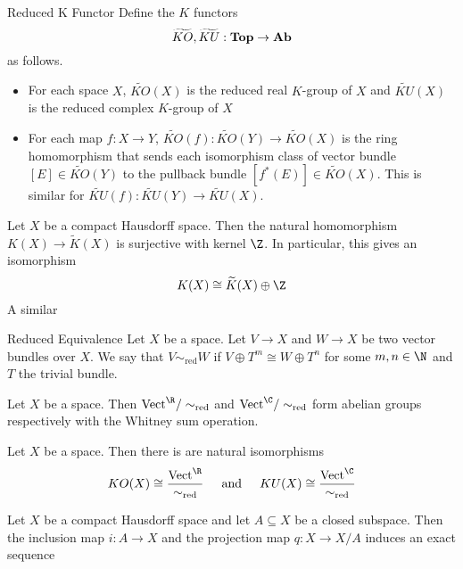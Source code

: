 \documentclass[a4paper]{article}
\begin{document}
\begin{defn}{Reduced K Functor}{} Define the $K$ functors $$\widetilde{KO},\widetilde{KU}:\bold{Top}\to\bold{Ab}$$ as follows. 
\begin{itemize}
\item For each space $X$, $\widetilde{KO}(X)$ is the reduced real $K$-group of $X$ and $\widetilde{KU}(X)$ is the reduced complex $K$-group of $X$
\item For each map $f:X\to Y$, $\widetilde{KO}(f):\widetilde{KO}(Y)\to\widetilde{KO}(X)$ is the ring homomorphism that sends each isomorphism class of vector bundle $[E]\in \widetilde{KO}(Y)$ to the pullback bundle $[f^\ast(E)]\in\widetilde{KO}(X)$. This is similar for $\widetilde{KU}(f):\widetilde{KU}(Y)\to\widetilde{KU}(X)$. 
\end{itemize}
\end{defn}

\begin{thm}{}{} Let $X$ be a compact Hausdorff space. Then the natural homomorphism $K(X)\to\widetilde{K}(X)$ is surjective with kernel $\Z$. In particular, this gives an isomorphism $$K(X)\cong\widetilde{K}(X)\oplus\Z$$ A similar 
\end{thm}

\begin{defn}{Reduced Equivalence}{} Let $X$ be a space. Let $V\to X$ and $W\to X$ be two vector bundles over $X$. We say that $V\sim_\text{red}W$ if $V\oplus T^m\cong W\oplus T^n$ for some $m,n\in\N$ and $T$ the trivial bundle. 
\end{defn}

\begin{prp}{}{} Let $X$ be a space. Then $\text{Vect}^\R/\sim_\text{red}$ and $\text{Vect}^\C/\sim_\text{red}$ form abelian groups respectively with the Whitney sum operation. 
\end{prp}

\begin{thm}{}{} Let $X$ be a space. Then there is are natural isomorphisms $$KO(X)\cong\frac{\text{Vect}^\R}{\sim_\text{red}}\;\;\;\;\text{ and }\;\;\;\;KU(X)\cong\frac{\text{Vect}^\C}{\sim_\text{red}}$$
\end{thm}

\begin{prp}{}{} Let $X$ be a compact Hausdorff space and let $A\subseteq X$ be a closed subspace. Then the inclusion map $i:A\to X$ and the projection map $q:X\to X/A$ induces an exact sequence \\~\\
\\~\\
\end{prp}
\end{document}
